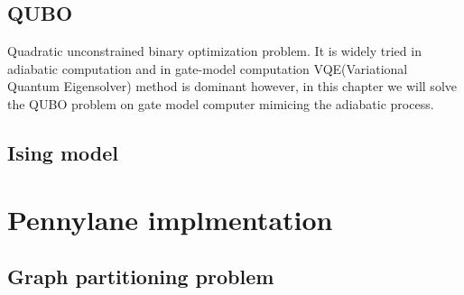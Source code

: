 \subsection{QUBO}

Quadratic unconstrained binary optimization problem.
It is widely tried in adiabatic computation and 
in gate-model computation VQE(Variational Quantum Eigensolver) method is 
dominant however, in this chapter we will solve the 
QUBO problem on gate model computer mimicing the adiabatic process.

\subsection{Ising model}

\section{Pennylane implmentation}

\subsection{Graph partitioning problem}




